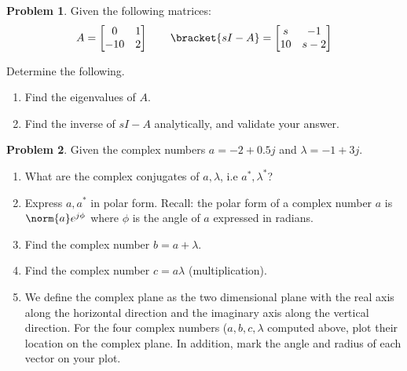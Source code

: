 \documentclass[10pt]{article}
\theoremstyle{definition}
\newtheorem{prob}{Problem}[section]
\newenvironment{subprob}%
{\renewcommand{\theenumi}{\alph{enumi}}\renewcommand{\labelenumi}{(\theenumi)}\begin{enumerate}}%
{\end{enumerate}}%
\begin{document}
\begin{prob}
    Given the following matrices:
        \begin{align*}
            A = \begin{bmatrix} 0 & 1 \\ -10 & 2\end{bmatrix} \qquad 
            \bracket{sI-A} = \begin{bmatrix} s & -1 \\ 10 & s- 2 \end{bmatrix}
        \end{align*}

    Determine the following.
    \begin{subprob}
    \item Find the eigenvalues of \( A\).
    \item Find the inverse of \( sI -A \) analytically, and validate your answer.
    \end{subprob}
\end{prob}

\clearpage\newpage

\begin{prob}
    Given the complex numbers \( a = -2 + 0.5 j \) and \( \lambda = -1 + 3 j\).

    \begin{subprob}
    \item What are the complex conjugates of \( a, \lambda\), i.e \( a^*, \lambda^*\)?
    \item Express \( a, a^*\) in polar form.
        Recall: the polar form of a complex number \( a \) is \( \norm{a} e^{j \phi} \) where \( \phi\) is the angle of \( a \) expressed in radians.
    \item Find the complex number \( b = a + \lambda\).
    \item Find the complex number \( c = a \lambda \) (multiplication).
    \item We define the complex plane as the two dimensional plane with the real axis along the horizontal direction and the imaginary axis along the vertical direction.
        For the four complex numbers (\( a, b, c, \lambda\) computed above, plot their location on the complex plane. 
        In addition, mark the angle and radius of each vector on your plot.
    \end{subprob}
\end{prob}
\end{document}
